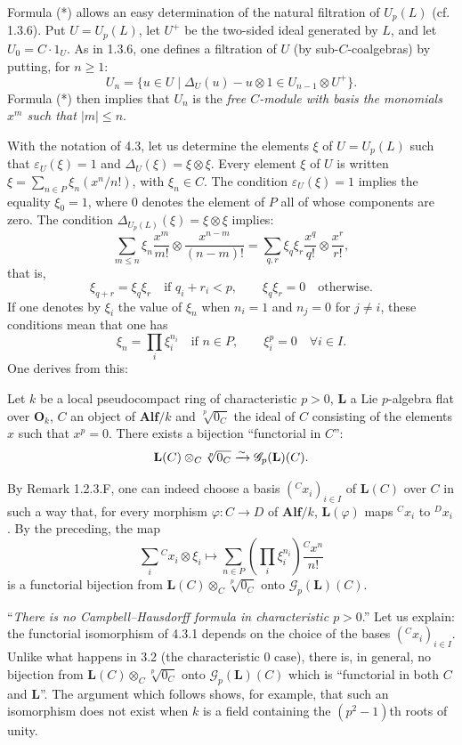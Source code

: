 Formula (*) allows an easy determination of the natural filtration of $U_p(L)$ (cf. 1.3.6). Put $U=U_p(L)$, let $U^+$ be the two-sided ideal generated by $L$, and let $U_0=C\cdot1_U$. As in 1.3.6, one defines a filtration of $U$ (by sub-$C$-coalgebras) by putting, for $n\ge1$:
\[
U_n=\{u\in U\mid\Delta_U(u)-u\otimes1\in U_{n-1}\otimes U^+\}.
\]
Formula (*) then implies that $U_n$ is the \emph{free $C$-module with basis the monomials $x^m$ such that $|m|\le n$}.

With the notation of 4.3, let us determine the elements $\xi$ of $U=U_p(L)$ such that $\varepsilon_U(\xi)=1$ and $\Delta_U(\xi)=\xi\otimes\xi$. Every element $\xi$ of $U$ is written $\xi=\sum_{n\in P}\xi_n(x^n/n!)$, with $\xi_n\in C$. The condition $\varepsilon_U(\xi)=1$ implies the equality $\xi_0=1$, where $0$ denotes the element of $P$ all of whose components are zero. The condition $\Delta_{U_p(L)}(\xi)=\xi\otimes\xi$ implies:
\[
\sum_{m\le n}\xi_n\frac{x^m}{m!}\otimes\frac{x^{n-m}}{(n-m)!}
=\sum_{q,r}\xi_q\xi_r\frac{x^q}{q!}\otimes\frac{x^r}{r!},
\]
that is,
\[
\xi_{q+r}=\xi_q\xi_r\quad\text{if }q_i+r_i<p,\qquad\xi_q\xi_r=0\quad\text{otherwise}.
\]
If one denotes by $\xi_i$ the value of $\xi_n$ when $n_i=1$ and $n_j=0$ for $j\ne i$, these conditions mean that one has
\[
\xi_n=\prod_i\xi_i^{n_i}\quad\text{if }n\in P,\qquad\xi_i^p=0\quad\forall i\in I.
\]
One derives from this:
\begin{proposition}{}
Let $k$ be a local pseudocompact ring of characteristic $p>0$, $\mathbf L$ a Lie $p$-algebra flat over $\mathbf O_k$, $C$ an object of $\mathbf{Alf}/k$ and $\sqrt[p]{0_C}$ the ideal of $C$ consisting of the elements $x$ such that $x^p=0$. There exists a bijection ``functorial in $C$'':
\[
\mathbf L(C)\otimes_C\sqrt[p]{0_C}\xrightarrow{\sim}\mathscr G_p(\mathbf L)(C).
\]
\end{proposition}
By Remark 1.2.3.F, one can indeed choose a basis $({}^Cx_i)_{i\in I}$ of $\mathbf L(C)$ over $C$ in such a way that, for every morphism $\varphi:C\to D$ of $\mathbf{Alf}/k$, $\mathbf L(\varphi)$ maps ${}^Cx_i$ to ${}^Dx_i$. By the preceding, the map
\[
\sum_i{}^Cx_i\otimes\xi_i\longmapsto\sum_{n\in P}\left(\prod_i\xi_i^{n_i}\right)\frac{{}^Cx^n}{n!}
\]
is a functorial bijection from $\mathbf L(C)\otimes_C\sqrt[p]{0_C}$ onto $\mathscr G_p(\mathbf L)(C)$.

``\emph{There is no Campbell--Hausdorff formula in characteristic $p>0$}.'' Let us explain: the functorial isomorphism of 4.3.1 depends on the choice of the bases $({}^Cx_i)_{i\in I}$. Unlike what happens in 3.2 (the characteristic $0$ case), there is, in general, no bijection from $\mathbf L(C)\otimes_C\sqrt[p]{0_C}$ onto $\mathscr G_p(\mathbf L)(C)$ which is ``functorial in both $C$ and $\mathbf L$''. The argument which follows shows, for example, that such an isomorphism does not exist when $k$ is a field containing the $(p^2-1)$th roots of unity.

